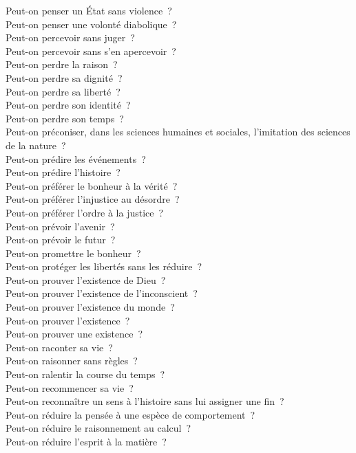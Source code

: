\documentclass[a4paper,12pt]{article}
\begin{document}
Peut-on penser un État sans violence ? \\
Peut-on penser une volonté diabolique ? \\
Peut-on percevoir sans juger ? \\
Peut-on percevoir sans s'en apercevoir ? \\
Peut-on perdre la raison ? \\
Peut-on perdre sa dignité ? \\
Peut-on perdre sa liberté ? \\
Peut-on perdre son identité ? \\
Peut-on perdre son temps ? \\
Peut-on préconiser, dans les sciences humaines et sociales, l'imitation des sciences de la nature ? \\
Peut-on prédire les événements ? \\
Peut-on prédire l'histoire ? \\
Peut-on préférer le bonheur à la vérité ? \\
Peut-on préférer l'injustice au désordre ? \\
Peut-on préférer l'ordre à la justice ? \\
Peut-on prévoir l'avenir ? \\
Peut-on prévoir le futur ? \\
Peut-on promettre le bonheur ? \\
Peut-on protéger les libertés sans les réduire ? \\
Peut-on prouver l'existence de Dieu ? \\
Peut-on prouver l'existence de l'inconscient ? \\
Peut-on prouver l'existence du monde ? \\
Peut-on prouver l'existence ? \\
Peut-on prouver une existence ? \\
Peut-on raconter sa vie ? \\
Peut-on raisonner sans règles ? \\
Peut-on ralentir la course du temps ? \\
Peut-on recommencer sa vie ? \\
Peut-on reconnaître un sens à l'histoire sans lui assigner une fin ? \\
Peut-on réduire la pensée à une espèce de comportement ? \\
Peut-on réduire le raisonnement au calcul ? \\
Peut-on réduire l'esprit à la matière ? \\
\end{document}
